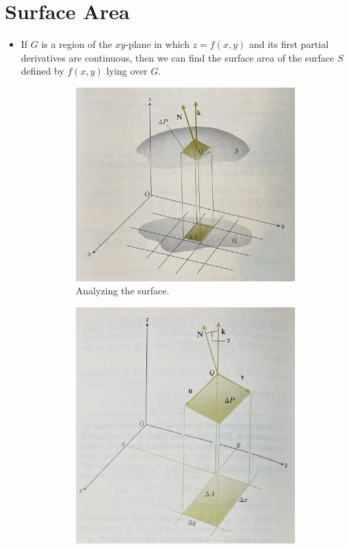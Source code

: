 \documentclass[../main.tex]{subfiles}
\begin{document}
\section{Surface Area}
\begin{itemize}
    \item If $G$ is a region of the $xy$-plane in which $z=f(x,y)$ and its first partial derivatives are continuous, then we can find the surface area of the surface $S$ defined by $f(x,y)$ lying over $G$.
    \begin{figure}[h!]
        \centering
        \begin{subfigure}[b]{0.4\linewidth}
            \centering
            \includegraphics[width=0.9\linewidth]{ExtFiles/surfaceAreaa.jpg}
            \caption{Analyzing the surface.}
            \label{fig:surfaceAreaa}
        \end{subfigure}
        \begin{subfigure}[b]{0.4\linewidth}
            \centering
            \includegraphics[width=0.9\linewidth]{ExtFiles/surfaceAreab.jpg}

\end{subfigure}
\end{figure}
\end{itemize}
\end{document}
